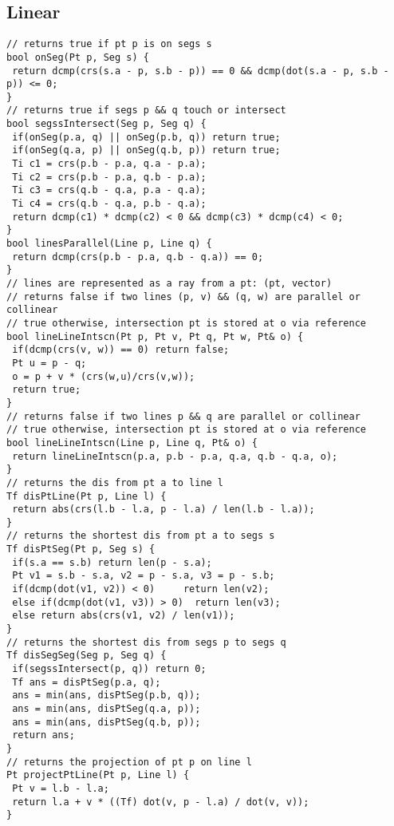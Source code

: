 \documentclass[a4paper,11pt,oneside]{article}
\begin{document}
\begin{multicols*}{\COLS}
\subsection{Linear}
\begin{lstlisting}
// returns true if pt p is on segs s
bool onSeg(Pt p, Seg s) {
 return dcmp(crs(s.a - p, s.b - p)) == 0 && dcmp(dot(s.a - p, s.b - p)) <= 0;
}
// returns true if segs p && q touch or intersect
bool segssIntersect(Seg p, Seg q) {
 if(onSeg(p.a, q) || onSeg(p.b, q)) return true;
 if(onSeg(q.a, p) || onSeg(q.b, p)) return true;
 Ti c1 = crs(p.b - p.a, q.a - p.a);
 Ti c2 = crs(p.b - p.a, q.b - p.a);
 Ti c3 = crs(q.b - q.a, p.a - q.a);
 Ti c4 = crs(q.b - q.a, p.b - q.a);
 return dcmp(c1) * dcmp(c2) < 0 && dcmp(c3) * dcmp(c4) < 0;
}
bool linesParallel(Line p, Line q) {
 return dcmp(crs(p.b - p.a, q.b - q.a)) == 0;
}
// lines are represented as a ray from a pt: (pt, vector)
// returns false if two lines (p, v) && (q, w) are parallel or collinear
// true otherwise, intersection pt is stored at o via reference
bool lineLineIntscn(Pt p, Pt v, Pt q, Pt w, Pt& o) {
 if(dcmp(crs(v, w)) == 0) return false;
 Pt u = p - q;
 o = p + v * (crs(w,u)/crs(v,w));
 return true;
}
// returns false if two lines p && q are parallel or collinear
// true otherwise, intersection pt is stored at o via reference
bool lineLineIntscn(Line p, Line q, Pt& o) {
 return lineLineIntscn(p.a, p.b - p.a, q.a, q.b - q.a, o);
}
// returns the dis from pt a to line l
Tf disPtLine(Pt p, Line l) {
 return abs(crs(l.b - l.a, p - l.a) / len(l.b - l.a));
}
// returns the shortest dis from pt a to segs s
Tf disPtSeg(Pt p, Seg s) {
 if(s.a == s.b) return len(p - s.a);
 Pt v1 = s.b - s.a, v2 = p - s.a, v3 = p - s.b;
 if(dcmp(dot(v1, v2)) < 0)     return len(v2);
 else if(dcmp(dot(v1, v3)) > 0)  return len(v3);
 else return abs(crs(v1, v2) / len(v1));
}
// returns the shortest dis from segs p to segs q
Tf disSegSeg(Seg p, Seg q) {
 if(segssIntersect(p, q)) return 0;
 Tf ans = disPtSeg(p.a, q);
 ans = min(ans, disPtSeg(p.b, q));
 ans = min(ans, disPtSeg(q.a, p));
 ans = min(ans, disPtSeg(q.b, p));
 return ans;
}
// returns the projection of pt p on line l
Pt projectPtLine(Pt p, Line l) {
 Pt v = l.b - l.a;
 return l.a + v * ((Tf) dot(v, p - l.a) / dot(v, v));
}
\end{lstlisting}

\end{multicols*}
\end{document}
